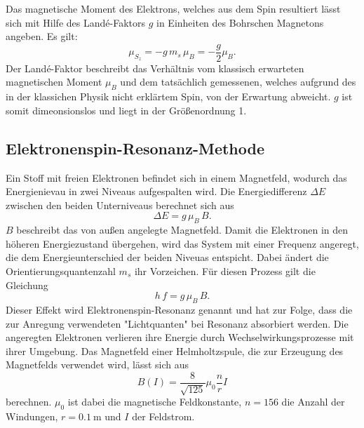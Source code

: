 Das magnetische Moment des Elektrons, welches aus dem Spin resultiert lässt sich mit Hilfe des Landé-Faktors $g$ in Einheiten des Bohrschen Magnetons angeben. Es gilt:
\begin{equation}
  \mu_{S_z} = -g\,m_s\,\mu_B = -\frac{g}{2}\mu_B.
\end{equation}
Der Landé-Faktor beschreibt das Verhältnis vom klassisch erwarteten magnetischen Moment $\mu_B$ und dem tatsächlich gemessenen, welches aufgrund des in der klassichen Physik nicht erklärtem Spin, von der Erwartung abweicht. $g$ ist somit dimeonsionslos und liegt in der Größenordnung 1.

\subsection{Elektronenspin-Resonanz-Methode}
Ein Stoff mit freien Elektronen befindet sich in einem Magnetfeld, wodurch das Energienievau in zwei Niveaus aufgespalten wird. Die Energiedifferenz $\Delta E$ zwischen den beiden Unterniveaus berechnet sich aus
\begin{equation}
  \Delta E = g\,\mu_B\,B.
\end{equation}
$B$ beschreibt das von außen angelegte Magnetfeld.
Damit die Elektronen in den höheren Energiezustand übergehen, wird das System mit einer Frequenz angeregt, die dem Energieunterschied der beiden Niveuas entspicht. Dabei ändert die Orientierungsquantenzahl $m_s$ ihr Vorzeichen. Für diesen Prozess gilt die Gleichung
\begin{equation}
\label{eqn:g}
  h\,f=g\,\mu_B\,B.
\end{equation}
Dieser Effekt wird Elektronenspin-Resonanz genannt und hat zur Folge, dass die zur Anregung verwendeten "Lichtquanten" bei Resonanz absorbiert werden. Die angeregten Elektronen verlieren ihre Energie durch Wechselwirkungsprozesse mit ihrer Umgebung.
Das Magnetfeld einer Helmholtzspule, die zur Erzeugung des Magnetfelds verwendet wird, lässt sich aus
\begin{equation}
\label{eqn:spule}
  B(I)=\frac{8}{\sqrt{125}}\mu_0\frac{n}{r}I
\end{equation}
berechnen. $\mu_0$ ist dabei die magnetische Feldkonstante, $n=156$ die Anzahl der Windungen, $r=\SI{0,1}{\meter}$ und $I$ der Feldstrom.
